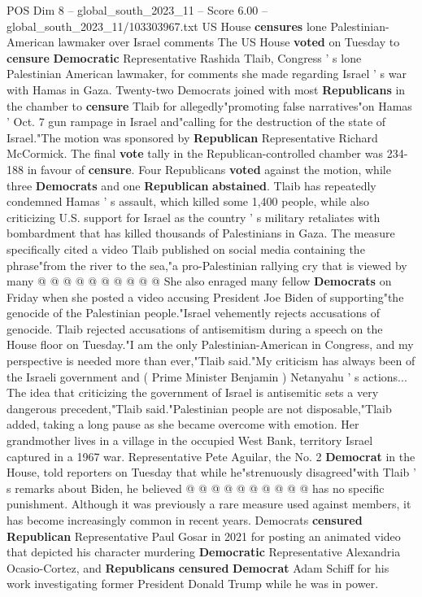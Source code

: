 \begin{textsample}{POS Dim 8 – global\_south\_2023\_11 – Score 6.00 – global\_south\_2023\_11/103303967.txt}  \label{ex:f8_pos_276}
US House \textbf{censures} lone Palestinian-American lawmaker over Israel comments The US House \textbf{voted} on Tuesday to \textbf{censure} \textbf{Democratic} Representative Rashida Tlaib, Congress ' s lone Palestinian American lawmaker, for comments she made regarding Israel ' s war with Hamas in Gaza.
Twenty-two Democrats joined with most \textbf{Republicans} in the chamber to \textbf{censure} Tlaib for allegedly"promoting false narratives"on Hamas ' Oct. 7 gun rampage in Israel and"calling for the destruction of the state of Israel."The motion was sponsored by \textbf{Republican} Representative Richard McCormick.
The final \textbf{vote} tally in the Republican-controlled chamber was 234-188 in favour of \textbf{censure}.
Four Republicans \textbf{voted} against the motion, while three \textbf{Democrats} and one \textbf{Republican} \textbf{abstained}.
Tlaib has repeatedly condemned Hamas ' s assault, which killed some 1,400 people, while also criticizing U.S. support for Israel as the country ' s military retaliates with bombardment that has killed thousands of Palestinians in Gaza.
The measure specifically cited a video Tlaib published on social media containing the phrase"from the river to the sea,"a pro-Palestinian rallying cry that is viewed by many @ @ @ @ @ @ @ @ @ @ She also enraged many fellow \textbf{Democrats} on Friday when she posted a video accusing President Joe Biden of supporting"the genocide of the Palestinian people."Israel vehemently rejects accusations of genocide.
Tlaib rejected accusations of antisemitism during a speech on the House floor on Tuesday."I am the only Palestinian-American in Congress, and my perspective is needed more than ever,"Tlaib said."My criticism has always been of the Israeli government and ( Prime Minister Benjamin ) Netanyahu ' s actions...
The idea that criticizing the government of Israel is antisemitic sets a very dangerous precedent,"Tlaib said."Palestinian people are not disposable,"Tlaib added, taking a long pause as she became overcome with emotion.
Her grandmother lives in a village in the occupied West Bank, territory Israel captured in a 1967 war.
Representative Pete Aguilar, the No. 2 \textbf{Democrat} in the House, told reporters on Tuesday that while he"strenuously disagreed"with Tlaib ' s remarks about Biden, he believed @ @ @ @ @ @ @ @ @ @ has no specific punishment.
Although it was previously a rare measure used against members, it has become increasingly common in recent years.
Democrats \textbf{censured} \textbf{Republican} Representative Paul Gosar in 2021 for posting an animated video that depicted his character murdering \textbf{Democratic} Representative Alexandria Ocasio-Cortez, and \textbf{Republicans} \textbf{censured} \textbf{Democrat} Adam Schiff for his work investigating former President Donald Trump while he was in power.

\end{textsample}
